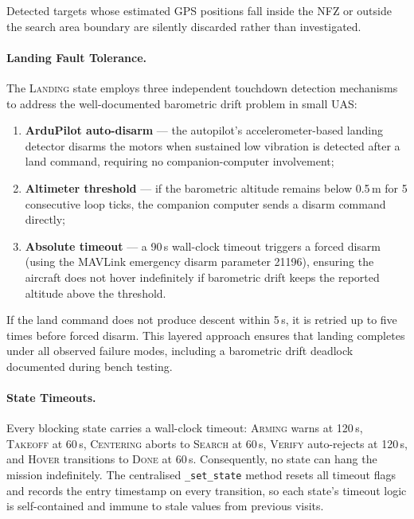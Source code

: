\noindent Detected targets whose estimated GPS positions fall inside the NFZ or outside the search area boundary are silently discarded rather than investigated.

\paragraph{Landing Fault Tolerance.}
The \textsc{Landing} state employs three independent touchdown detection mechanisms to address the well-documented barometric drift problem in small UAS:

\begin{enumerate}
    \item \textbf{ArduPilot auto-disarm} --- the autopilot's accelerometer-based landing detector disarms the motors when sustained low vibration is detected after a land command, requiring no companion-computer involvement;
    \item \textbf{Altimeter threshold} --- if the barometric altitude remains below 0.5\,m for 5 consecutive loop ticks, the companion computer sends a disarm command directly;
    \item \textbf{Absolute timeout} --- a 90\,s wall-clock timeout triggers a forced disarm (using the MAVLink emergency disarm parameter 21196), ensuring the aircraft does not hover indefinitely if barometric drift keeps the reported altitude above the threshold.
\end{enumerate}

\noindent If the land command does not produce descent within 5\,s, it is retried up to five times before forced disarm. This layered approach ensures that landing completes under all observed failure modes, including a barometric drift deadlock documented during bench testing.

\paragraph{State Timeouts.}
Every blocking state carries a wall-clock timeout: \textsc{Arming} warns at 120\,s, \textsc{Takeoff} at 60\,s, \textsc{Centering} aborts to \textsc{Search} at 60\,s, \textsc{Verify} auto-rejects at 120\,s, and \textsc{Hover} transitions to \textsc{Done} at 60\,s. Consequently, no state can hang the mission indefinitely. The centralised \texttt{\_set\_state} method resets all timeout flags and records the entry timestamp on every transition, so each state's timeout logic is self-contained and immune to stale values from previous visits.
